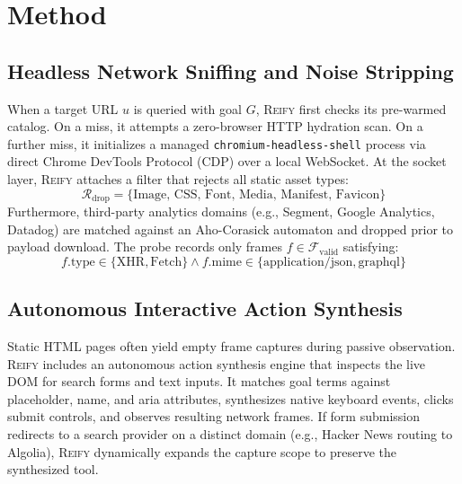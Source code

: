 \documentclass[10pt,twocolumn]{article}
\begin{document}
\section{Method}

\subsection{Headless Network Sniffing and Noise Stripping}
When a target URL $u$ is queried with goal $G$, \textsc{Reify} first checks its pre-warmed catalog. On a miss, it attempts a zero-browser HTTP hydration scan. On a further miss, it initializes a managed \texttt{chromium-headless-shell} process via direct Chrome DevTools Protocol (CDP) over a local WebSocket. At the socket layer, \textsc{Reify} attaches a filter that rejects all static asset types:
\begin{equation}
    \mathcal{R}_{\text{drop}} = \{\text{Image, CSS, Font, Media, Manifest, Favicon}\}
\end{equation}
Furthermore, third-party analytics domains (e.g., Segment, Google Analytics, Datadog) are matched against an Aho-Corasick automaton and dropped prior to payload download. The probe records only frames $f \in \mathcal{F}_{\text{valid}}$ satisfying:
\begin{equation}
    f.\text{type} \in \{\text{XHR}, \text{Fetch}\} \land f.\text{mime} \in \{\text{application/json}, \text{graphql}\}
\end{equation}

\subsection{Autonomous Interactive Action Synthesis}
Static HTML pages often yield empty frame captures during passive observation. \textsc{Reify} includes an autonomous action synthesis engine that inspects the live DOM for search forms and text inputs. It matches goal terms against placeholder, name, and aria attributes, synthesizes native keyboard events, clicks submit controls, and observes resulting network frames. If form submission redirects to a search provider on a distinct domain (e.g., Hacker News routing to Algolia), \textsc{Reify} dynamically expands the capture scope to preserve the synthesized tool.
\end{document}
